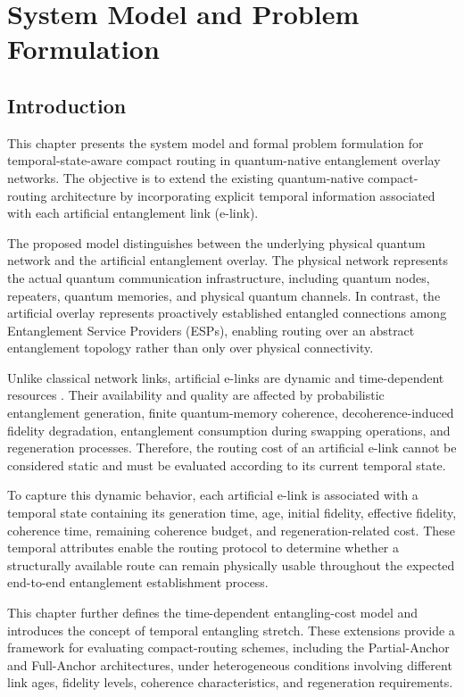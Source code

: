 \chapter{System Model and Problem Formulation}

\section{Introduction}

This chapter presents the system model and formal problem formulation for temporal-state-aware compact routing in quantum-native entanglement overlay networks. The objective is to extend the existing quantum-native compact-routing architecture by incorporating explicit temporal information associated with each artificial entanglement link (e-link).

The proposed model distinguishes between the underlying physical quantum network and the artificial entanglement overlay. The physical network represents the actual quantum communication infrastructure, including quantum nodes, repeaters, quantum memories, and physical quantum channels. In contrast, the artificial overlay represents proactively established entangled connections among Entanglement Service Providers (ESPs), enabling routing over an abstract entanglement topology rather than only over physical connectivity.

Unlike classical network links, artificial e-links are dynamic and time-dependent resources \cite{caleffi2025quantumarchitecture,ercetin2026fidelityage,ceran2026age} . Their availability and quality are affected by probabilistic entanglement generation, finite quantum-memory coherence, decoherence-induced fidelity degradation, entanglement consumption during swapping operations, and regeneration processes. Therefore, the routing cost of an artificial e-link cannot be considered static and must be evaluated according to its current temporal state.

To capture this dynamic behavior, each artificial e-link is associated with a temporal state containing its generation time, age, initial fidelity, effective fidelity, coherence time, remaining coherence budget, and regeneration-related cost. These temporal attributes enable the routing protocol to determine whether a structurally available route can remain physically usable throughout the expected end-to-end entanglement establishment process.

This chapter further defines the time-dependent entangling-cost model and introduces the concept of temporal entangling stretch. These extensions provide a framework for evaluating compact-routing schemes, including the Partial-Anchor and Full-Anchor architectures, under heterogeneous conditions involving different link ages, fidelity levels, coherence characteristics, and regeneration requirements.

